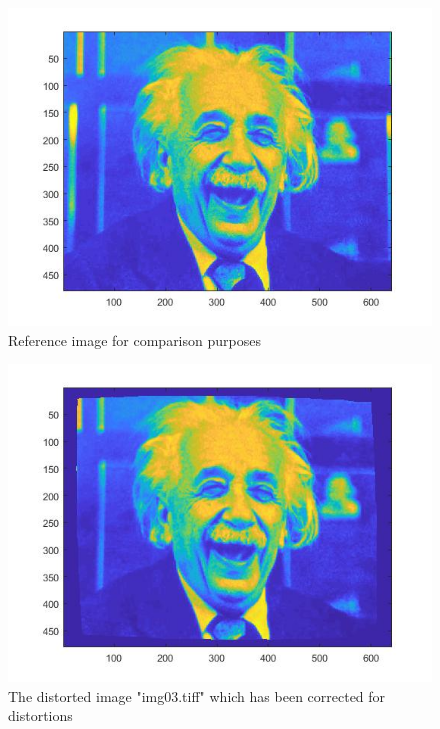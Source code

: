\documentclass[12pt,oneside,openany,a4paper, %
english, %
masters-t, goldenblock]{usthesis}
\begin{document}

\begin{figure}[H]
    \centering
    \includegraphics[scale=0.6]{reference_image2.jpg}
    \caption{Reference image for comparison purposes}
    \label{fig:reference3}
\end{figure}

\begin{figure}[H]
    \centering
    \includegraphics[scale=0.6]{partC.jpg}
    \caption{The distorted image "img03.tiff" which has been corrected for distortions}
    \label{fig:undist3}
\end{figure}
\end{document}
